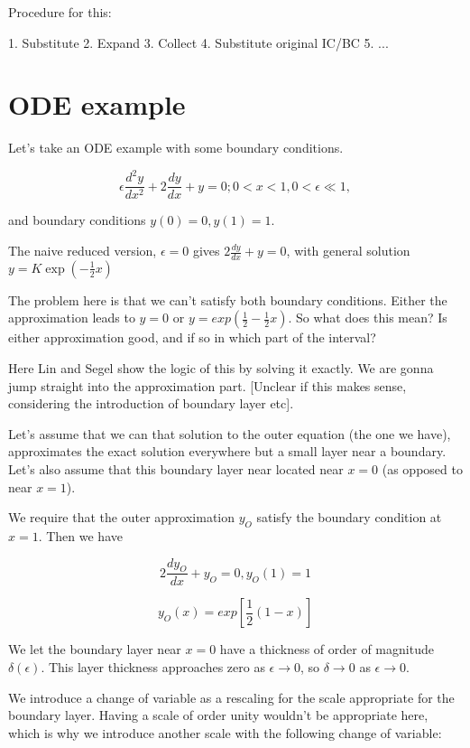 \documentclass[12pt]{report}
\begin{document}
Procedure for this:

1. Substitute
2. Expand
3. Collect
4. Substitute original IC/BC
5. ...

\section{ODE example}

Let's take an ODE example with some boundary conditions.


\begin{equation}
    \epsilon \frac{d^2y}{dx^2} + 2 \frac{dy}{dx} + y = 0; 0 < x < 1, 0 <
\epsilon \ll 1,
\end{equation}

and boundary conditions $y(0)=0, y(1) =1$.

The naive reduced version, $\epsilon = 0$ gives $2 \frac{dy}{dx} + y = 0$, with
general solution $y=K \exp(-\frac{1}{2} x)$

The problem here is that we can't satisfy both boundary conditions. Either the
approximation leads to $y=0$ or $y=exp(\frac 1 2 - \frac 1 2 x)$. So what does
this mean? Is either approximation good, and if so in which part of the
interval?

Here Lin and Segel show the logic of this by solving it exactly. We are gonna
jump straight into the approximation part. [Unclear if this makes sense,
considering the introduction of boundary layer etc].

Let's assume that we can that solution to the outer equation (the one we have),
approximates the exact solution everywhere but a small layer near a boundary.
Let's also assume that this boundary layer near located near $x=0$ (as opposed to near $x=1$).

We require that the outer approximation $y_O$ satisfy the boundary condition at
$x=1$. Then we have

$$2 \frac{dy_O}{dx} + y_O = 0, y_O(1)=1$$

$$y_O(x) = exp[\frac 1 2 (1-x)]$$

We let the boundary layer near $x=0$ have a thickness of order of magnitude
$\delta(\epsilon)$. This layer thickness approaches zero as $\epsilon \to 0$, so
$\delta \to 0$ as $\epsilon \to 0$.

We introduce a change of variable as a rescaling for the scale appropriate for
the boundary layer. Having a scale of order unity wouldn't be appropriate here,
which is why we introduce another scale with the following change of variable:
\end{document}

